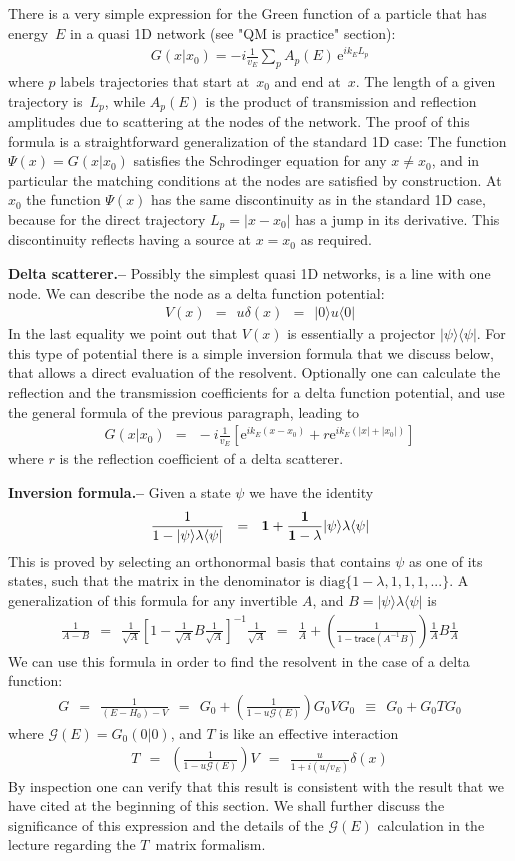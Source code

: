 \documentclass[onecolumn,fleqn]{revtex4}
\newcommand{\trc}{\mathsf{trace}}
\newcommand{\eexp}{\mathrm{e}^}
\newcommand{\beq}{\begin{eqnarray}}
\newcommand{\eeq}{\end{eqnarray}}
\begin{document}
There is a very simple expression for the Green function of a particle 
that has energy~$E$ in a quasi 1D network (see "QM is practice" section):
\beq
G(x|x_0) = -i\frac{1}{v_E} \sum_p A_p(E) \, \eexp{ik_E L_p}
\eeq
where $p$ labels trajectories that start at~$x_0$ and end at~$x$.  
The length of a given trajectory is~$L_p$, while $A_p(E)$ 
is the product of transmission and reflection amplitudes 
due to scattering at the nodes of the network.
The proof of this formula is a straightforward generalization 
of the standard 1D case: The function $\Psi(x)=G(x|x_0)$ satisfies the Schrodinger 
equation for any $x\ne x_0$, and in particular the matching 
conditions at the nodes are satisfied by construction.
At $x_0$ the function $\Psi(x)$ has the same discontinuity 
as in the standard 1D case, because for the direct trajectory $L_p=|x-x_0|$ 
has a jump in its derivative. 
This discontinuity reflects having a source at $x=x_0$ as required.   



{\bf Delta scatterer.-- } 
Possibly the simplest quasi 1D networks, is a line with one node. 
We can describe the node as a delta function potential:
\beq
V(x) \ \ = \ \ u\delta(x) \ \ = \ \   |0 \rangle u \langle 0|
\eeq
In the last equality we point out that $V(x)$ is essentially 
a projector $|\psi\rangle\langle \psi|$. For this type of potential   
there is a simple inversion formula that we discuss below,  
that allows a direct evaluation of the resolvent.     
Optionally one can calculate the reflection and the transmission 
coefficients for a delta function potential, and use the 
general formula of the previous paragraph, leading to 
\beq
G(x|x_0) \ \ = \ \ -i\frac{1}{v_E} \left[ \eexp{ik_E (x-x_0)} + r \eexp{ik_E(|x|+|x_0|)}\right] 
\eeq
where $r$ is the reflection coefficient of a delta scatterer. 


{\bf Inversion formula.-- }
Given a state $\psi$  we have the identity 
\beq
\frac{1}{1-|\psi\rangle\lambda\langle \psi|} 
\ \ = \ \ 
\bf{1}+\frac{1}{1-\lambda}|\psi\rangle\lambda\langle \psi|
\eeq
This is proved by selecting an orthonormal basis that contains $\psi$ 
as one of its states, such that the matrix in the denominator 
is ${\mbox{diag}\{1{-}\lambda,1,1,1,...\}}$.  
A generalization of this formula for any invertible $A$, 
and $B=|\psi\rangle\lambda\langle\psi|$ is
\beq
\frac{1}{A-B} 
\ \ = \ \ 
\frac{1}{\sqrt{A}} \left[1- \frac{1}{\sqrt{A}}B\frac{1}{\sqrt{A}}\right]^{-1} \frac{1}{\sqrt{A}}
\ \ = \ \ 
\frac{1}{A}+  \left(\frac{1}{1-\trc(A^{-1}B)}\right) \frac{1}{A}B\frac{1}{A}
\eeq
We can use this formula in order to find the resolvent 
in the case of a delta function:
\beq
G \ \ = \ \ 
\frac{1}{(E-H_0)-V} 
\ \ = \ \ 
G_0 +  \left(\frac{1}{1-u\mathcal{G}(E)}\right) G_0 V G_0 
\ \ \equiv \ \ 
G_0 +  G_0 T G_0  
\eeq
where $\mathcal{G}(E)=G_0(0|0)$, and $T$ is like an effective interaction   
\beq
T \ \ = \ \ \left(\frac{1}{1-u\mathcal{G}(E)}\right) V \ \ = \ \  \frac{u}{1+i(u/v_E)}\delta(x) 
\eeq
By inspection one can verify that this result is 
consistent with the result that we have cited at the 
beginning of this section.   
We shall further discuss the significance of this expression 
and the details of the $\mathcal{G}(E)$ calculation in 
the lecture regarding the $T$~matrix formalism.
\end{document}
